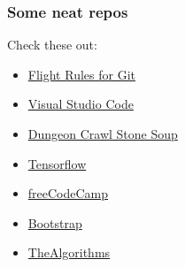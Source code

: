 \documentclass[unknownkeysallowed]{beamer}
\begin{document}
\begin{frame}
    \frametitle{Some neat repos}
    \vspace{0.75cm}
    Check these out:
    \vspace{0.25cm}
    \begin{itemize}
        \item{\href{https://github.com/k88hudson/git-flight-rules}{Flight Rules for Git}}
        \item{\href{https://github.com/Microsoft/vscode}{Visual Studio Code}}
        \item{\href{https://github.com/crawl/crawl}{Dungeon Crawl Stone Soup}}
        \item{\href{https://github.com/tensorflow/tensorflow}{Tensorflow}}
        \item{\href{https://github.com/freeCodeCamp/freeCodeCamp}{freeCodeCamp}}
        \item{\href{https://github.com/twbs/bootstrap}{Bootstrap}}
        \item{\href{https://github.com/TheAlgorithms/Python}{TheAlgorithms}}
    \end{itemize}
\end{frame}
\end{document}

